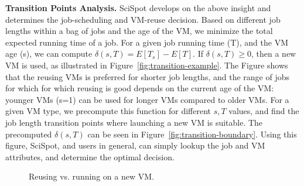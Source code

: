 \noindent \textbf{Transition Points Analysis.}
SciSpot develops on the above insight and determines the job-scheduling and VM-reuse decision.
Based on different job lengths within a bag of jobs and the age of the VM, we minimize the total expected running time of a job.
For a given job running time (T), and the VM age (s), we can compute  $\delta(s,T) = E[T_s] - E[T]$.
If $\delta(s,T) \geq 0$, then a new VM is used, as illustrated in Figure~\ref{fig:transition-example}.
The Figure shows that the reusing VMs is preferred for shorter job lengths, and the range of jobs for which for which reusing is good depends on the current age of the VM: younger VMs (s=1) can be used for longer VMs compared to older VMs. 
For a given VM type, we precompute this function for different $s,T$ values, and find the job length transition points where launching a new VM is suitable. 
The precomputed $\delta(s,T)$ can be seen in Figure~\ref{fig:transition-boundary}.
Using this figure, SciSpot, and users in general, can simply lookup the job and VM attributes, and determine the optimal decision. 




\begin{figure}[t]
  \hfill
  \label{fig:transition-all}
  \caption{Reusing vs. running on a new VM.}
\end{figure}

